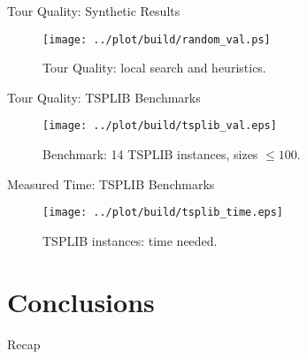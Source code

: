 \documentclass[
  size=8pt,
  style=klope,
  paper=screen,
  pauseslide,
  nopagebreaks,
  hlsections,
  fleqn
]{powerdot}
\begin{document}
\begin{slide}[toc=Benchmarks: Solutions]{Tour Quality: Synthetic Results}
  \begin{figure}[H]
    \centering
    \texttt{[image: ../plot/build/random\_val.ps]}
    \caption{Tour Quality: local search and heuristics.}
  \end{figure}
\end{slide}

\begin{slide}[toc=]{Tour Quality: TSPLIB Benchmarks}
  \begin{figure}[H]
    \centering
    \texttt{[image: ../plot/build/tsplib\_val.eps]}
    \caption{Benchmark: 14 TSPLIB instances, sizes $\leq 100$.}
  \end{figure}
\end{slide}

\begin{slide}[toc=]{Measured Time: TSPLIB Benchmarks}
  \begin{figure}[H]
    \centering
    \texttt{[image: ../plot/build/tsplib\_time.eps]}
    \caption{TSPLIB instances: time needed.}
  \end{figure}
\end{slide}

\section[template=wideslide]{Conclusions}

\begin{slide}[toc=Recap]{Recap}
\tableofcontents[content=all,type=0]
\end{slide}
\end{document}
